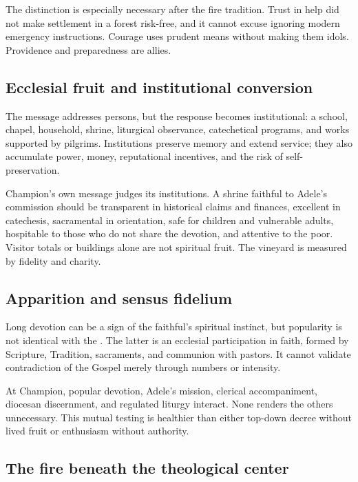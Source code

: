 The distinction is especially necessary after the fire tradition. Trust in help did not make settlement in a forest risk-free, and it cannot excuse ignoring modern emergency instructions. Courage uses prudent means without making them idols. Providence and preparedness are allies.

\subsection{Ecclesial fruit and institutional conversion}

The message addresses persons, but the response becomes institutional: a school, chapel, household, shrine, liturgical observance, catechetical programs, and works supported by pilgrims. Institutions preserve memory and extend service; they also accumulate power, money, reputational incentives, and the risk of self-preservation.

Champion's own message judges its institutions. A shrine faithful to Adele's commission should be transparent in historical claims and finances, excellent in catechesis, sacramental in orientation, safe for children and vulnerable adults, hospitable to those who do not share the devotion, and attentive to the poor. Visitor totals or buildings alone are not spiritual fruit. The vineyard is measured by fidelity and charity.

\subsection{Apparition and sensus fidelium}

Long devotion can be a sign of the faithful's spiritual instinct, but popularity is not identical with the . The latter is an ecclesial participation in faith, formed by Scripture, Tradition, sacraments, and communion with pastors. It cannot validate contradiction of the Gospel merely through numbers or intensity.

At Champion, popular devotion, Adele's mission, clerical accompaniment, diocesan discernment, and regulated liturgy interact. None renders the others unnecessary. This mutual testing is healthier than either top-down decree without lived fruit or enthusiasm without authority.

\subsection{The fire beneath the theological center}

